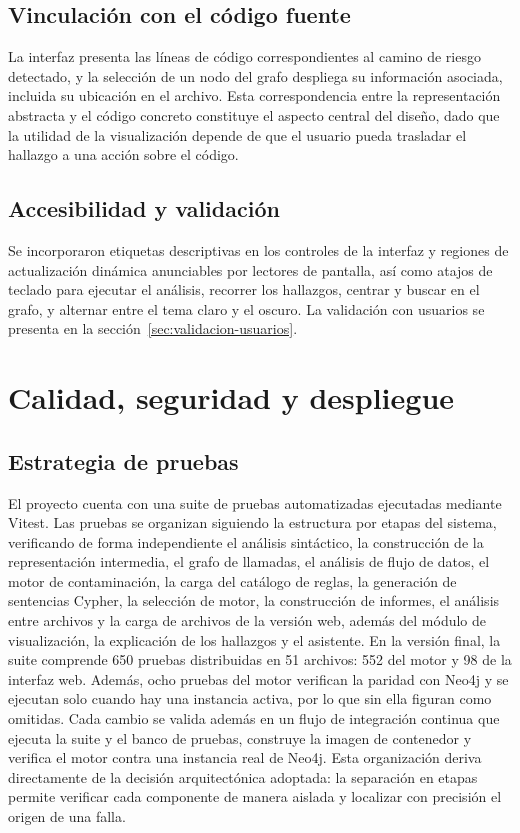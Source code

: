 \subsection{Vinculación con el código fuente}\label{sec:n4.6.4}

La interfaz presenta las líneas de código correspondientes al camino de riesgo detectado, y la selección de un nodo del grafo despliega su información asociada, incluida su ubicación en el archivo. Esta correspondencia entre la representación abstracta y el código concreto constituye el aspecto central del diseño, dado que la utilidad de la visualización depende de que el usuario pueda trasladar el hallazgo a una acción sobre el código.

\subsection{Accesibilidad y validación}\label{sec:n4.6.5}

Se incorporaron etiquetas descriptivas en los controles de la interfaz y regiones de actualización dinámica anunciables por lectores de pantalla, así como atajos de teclado para ejecutar el análisis, recorrer los hallazgos, centrar y buscar en el grafo, y alternar entre el tema claro y el oscuro. La validación con usuarios se presenta en la sección~\ref{sec:validacion-usuarios}.

\section{Calidad, seguridad y despliegue}\label{sec:n4.7}

\subsection{Estrategia de pruebas}\label{sec:n4.7.1}

El proyecto cuenta con una suite de pruebas automatizadas ejecutadas mediante Vitest. Las pruebas se organizan siguiendo la estructura por etapas del sistema, verificando de forma independiente el análisis sintáctico, la construcción de la representación intermedia, el grafo de llamadas, el análisis de flujo de datos, el motor de contaminación, la carga del catálogo de reglas, la generación de sentencias Cypher, la selección de motor, la construcción de informes, el análisis entre archivos y la carga de archivos de la versión web, además del módulo de visualización, la explicación de los hallazgos y el asistente. En la versión final, la suite comprende 650 pruebas distribuidas en 51 archivos: 552 del motor y 98 de la interfaz web. Además, ocho pruebas del motor verifican la paridad con Neo4j y se ejecutan solo cuando hay una instancia activa, por lo que sin ella figuran como omitidas. Cada cambio se valida además en un flujo de integración continua que ejecuta la suite y el banco de pruebas, construye la imagen de contenedor y verifica el motor contra una instancia real de Neo4j. Esta organización deriva directamente de la decisión arquitectónica adoptada: la separación en etapas permite verificar cada componente de manera aislada y localizar con precisión el origen de una falla.

